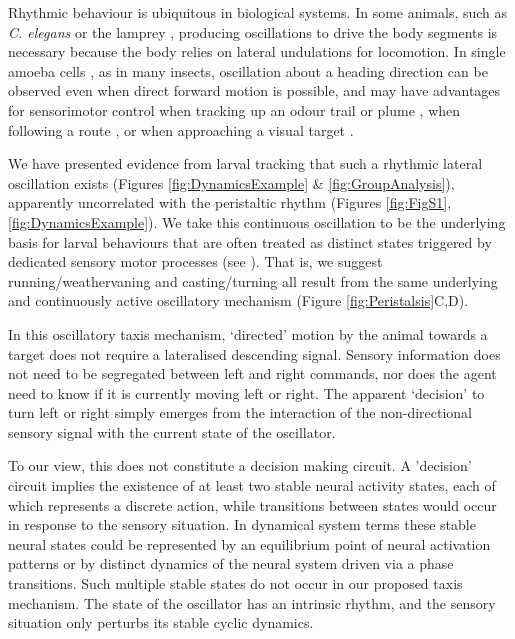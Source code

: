 \documentclass[11pt,a4paper]{article}
\begin{document}
 Rhythmic behaviour is ubiquitous in biological systems. In some animals, such as {\it C. elegans} \citep{iino2009parallel,izquierdo2010evolution,lockery2011computational}  or the lamprey  \citep{lansner1997realistic,wilson1999spikes}, producing oscillations to drive the body segments is necessary because the body relies on lateral undulations for locomotion.
 In single amoeba cells \citep{yangzigzag2011}, as in many insects, oscillation about a heading direction can be observed even when direct forward motion is possible, and may have advantages for sensorimotor control when tracking up an odour trail  \citep{hangartner1969structure,farkas1972chemical} or plume \citep{budick2006free,belanger1996centrally,willis1997centrally,willis2008effects,carde2008navigational}  , when following a route \citep{lent2010image,kodzhabashev2015route}, or when approaching a visual target \citep{wallace1962experiments,philippides2013bumblebee,voss1998active}.

 We have presented evidence from larval tracking that such a rhythmic lateral oscillation exists (Figures \ref{fig:DynamicsExample} \& \ref{fig:GroupAnalysis}), apparently uncorrelated with the peristaltic rhythm (Figures \ref{fig:FigS1},\ref{fig:DynamicsExample}).
We take this continuous oscillation to be the underlying basis for larval behaviours that are often treated as distinct states triggered by dedicated sensory motor processes (see \cite{green1983organization,sawin1994sensorimotor, cobbwhatandhow1999,vogelstein2014discovery, gomez2012active, gomez2014multilevel, hernandez2015reverse,gepner2015computations}).
 That is, we suggest running/weathervaning and casting/turning all result from the same underlying and continuously active oscillatory mechanism (Figure \ref{fig:Peristalsis}C,D).
 
 In this oscillatory taxis mechanism, ‘directed’ motion by the animal towards a target does not require a lateralised descending signal. Sensory information does not need to be segregated between left and right commands, nor does the agent need to know if it is currently moving left or right. The apparent ‘decision’ to turn left or right simply emerges from the interaction of the non-directional sensory signal with the current state of the oscillator.
 
 To our view, this does not constitute a decision making circuit.
  A 'decision' circuit implies the existence of at least two stable neural activity states, each of which  represents a discrete action, while transitions between states would occur in response to the sensory situation.
  In dynamical system terms these stable neural states could be represented by an equilibrium point of neural activation patterns or by distinct dynamics of the neural system driven via a phase transitions.
   Such multiple stable states do not occur in our proposed taxis mechanism. The state of the oscillator has an intrinsic rhythm, and the sensory situation only perturbs its stable cyclic dynamics. 
\end{document}
